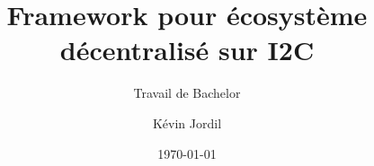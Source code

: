 \author{Kévin Jordil}


\title{Framework pour écosystème décentralisé sur I2C}

\subtitle{Travail de Bachelor}


\date{\today}


